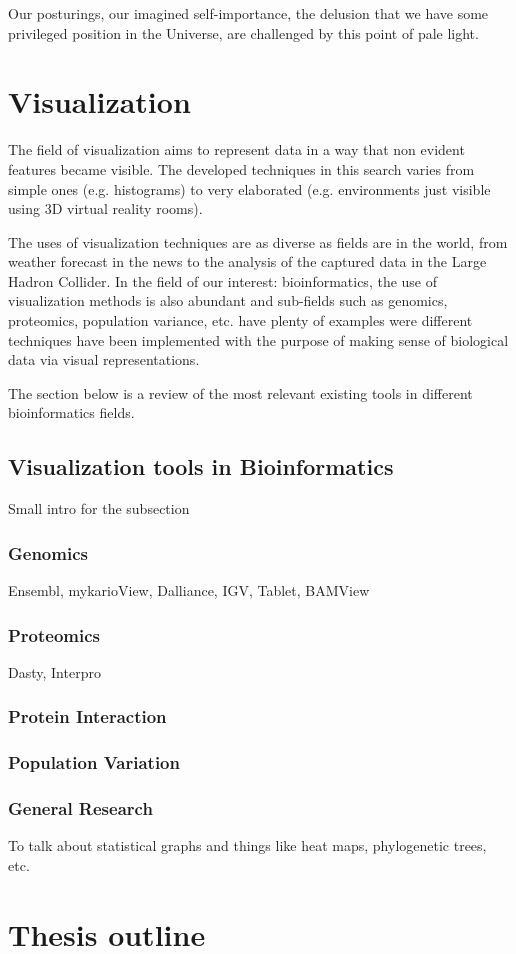 \begin{savequote}[75mm] 
Our posturings, our imagined self-importance, the delusion that we have some privileged position in the Universe, are challenged by this point of pale light.
\end{savequote}
\section{Visualization}
The field of visualization aims to represent data in a way that non evident features became visible. The developed techniques in this search varies from simple ones (e.g. histograms) to very elaborated (e.g. environments just visible using 3D virtual reality rooms).

The uses of visualization techniques are as diverse as fields are in the world, from weather forecast in the news to the analysis of the captured data in the Large Hadron Collider. In the field of our interest: bioinformatics, the use of visualization methods is also abundant and sub-fields such as genomics, proteomics, population variance, etc. have plenty of examples were different techniques have been implemented with the purpose of making sense of biological data via visual representations.

The section below is a review of the most relevant existing tools in different bioinformatics fields.
\subsection{Visualization tools in Bioinformatics}
Small intro for the subsection
\subsubsection{Genomics}
Ensembl, mykarioView, Dalliance, IGV, Tablet, BAMView
\subsubsection{Proteomics}
Dasty, Interpro
\subsubsection{Protein Interaction}
\subsubsection{Population Variation}
\subsubsection{General Research}
To talk about statistical graphs and things like heat maps, phylogenetic trees, etc.


\section{Thesis outline}
